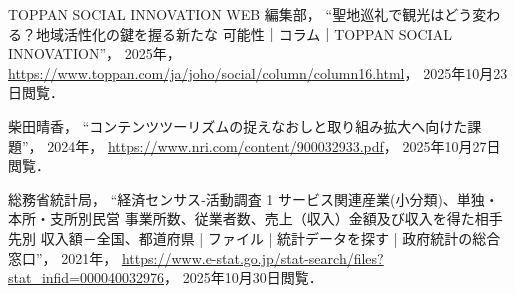 \documentclass{docs}
\begin{document}
\begin{thebibliography}{99}
	TOPPAN SOCIAL INNOVATION WEB 編集部，
	“聖地巡礼で観光はどう変わる？地域活性化の鍵を握る新たな
	可能性｜コラム｜TOPPAN SOCIAL INNOVATION”，
	2025年，
	\url{https://www.toppan.com/ja/joho/social/column/column16.html}，
	2025年10月23日閲覧．

	柴田晴香，
	“コンテンツツーリズムの捉えなおしと取り組み拡大へ向けた課題”，
	2024年，
	\url{https://www.nri.com/content/900032933.pdf}，
	2025年10月27日閲覧．

	総務省統計局，
	“経済センサス‐活動調査 1 サービス関連産業(小分類)、単独・本所・支所別民営
	事業所数、従業者数、売上（収入）金額及び収入を得た相手先別
	収入額－全国、都道府県 | ファイル | 統計データを探す | 政府統計の総合窓口”，
	2021年，
	\url{https://www.e-stat.go.jp/stat-search/files?stat_infid=000040032976}，
	2025年10月30日閲覧．
\end{thebibliography}
\end{document}
